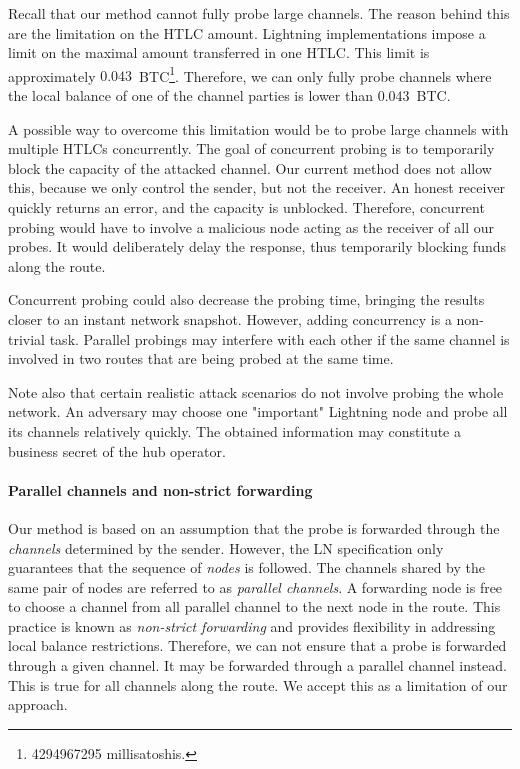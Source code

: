 Recall that our method cannot fully probe large channels.
The reason behind this are the limitation on the HTLC amount.
Lightning implementations impose a limit on the maximal amount transferred in one HTLC\@.
This limit is approximately $0.043$~BTC\footnote{4294967295 millisatoshis.}.
Therefore, we can only fully probe channels where the local balance of one of the channel parties is lower than $0.043$~BTC\@.

A possible way to overcome this limitation would be to probe large channels with multiple HTLCs concurrently.
The goal of concurrent probing is to temporarily block the capacity of the attacked channel.
Our current method does not allow this, because we only control the sender, but not the receiver.
An honest receiver quickly returns an error, and the capacity is unblocked.
Therefore, concurrent probing would have to involve a malicious node acting as the receiver of all our probes.
It would deliberately delay the response, thus temporarily blocking funds along the route.

Concurrent probing could also decrease the probing time, bringing the results closer to an instant network snapshot.
However, adding concurrency is a non-trivial task.
Parallel probings may interfere with each other if the same channel is involved in two routes that are being probed at the same time.

Note also that certain realistic attack scenarios do not involve probing the whole network.
An adversary may choose one "important" Lightning node and probe all its channels relatively quickly.
The obtained information may constitute a business secret of the hub operator.


\paragraph{Parallel channels and non-strict forwarding}

Our method is based on an assumption that the probe is forwarded through the \textit{channels} determined by the sender.
However, the LN specification only guarantees that the sequence of \textit{nodes} is followed.
The channels shared by the same pair of nodes are referred to as \textit{parallel channels}.
A forwarding node is free to choose a channel from all parallel channel to the next node in the route.
This practice is known as \textit{non-strict forwarding} and provides flexibility in addressing local balance restrictions.
Therefore, we can not ensure that a probe is forwarded through a given channel.
It may be forwarded through a parallel channel instead.
This is true for all channels along the route.
We accept this as a limitation of our approach.

